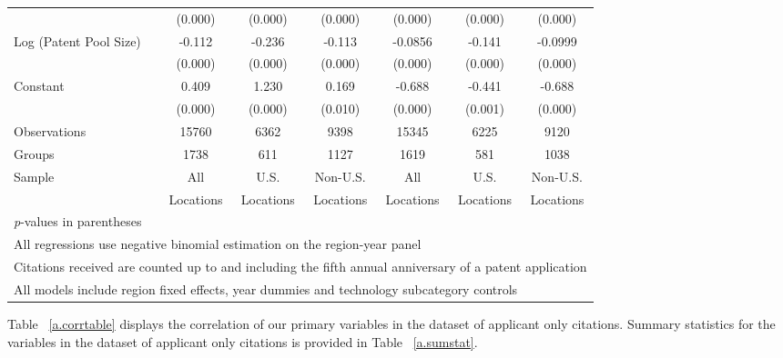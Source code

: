 \documentclass[12pt,letterpaper]{article}
\begin{document}
\begin{table}[htbp]
\begin{tabular}{l*{6}{c}}
                &  (0.000)&  (0.000)&  (0.000)&  (0.000)&  (0.000)&  (0.000)\\
Log (Patent Pool Size)&   -0.112&   -0.236&   -0.113&  -0.0856&   -0.141&  -0.0999\\
                &  (0.000)&  (0.000)&  (0.000)&  (0.000)&  (0.000)&  (0.000)\\
Constant        &    0.409&    1.230&    0.169&   -0.688&   -0.441&   -0.688\\
                &  (0.000)&  (0.000)&  (0.010)&  (0.000)&  (0.001)&  (0.000)\\
\hline
Observations    &    15760&     6362&     9398&    15345&     6225&     9120\\
Groups          &     1738&      611&     1127&     1619&      581&     1038\\
Sample&All &U.S. &Non-U.S.&All &U.S. &Non-U.S. \\
          &Locations &Locations&Locations&Locations &Locations&Locations \\
\hline\hline
\multicolumn{7}{l}{\footnotesize \textit{p}-values in parentheses}\\
\multicolumn{7}{l}{\footnotesize All regressions use negative binomial estimation on the region-year panel}\\
\multicolumn{7}{l}{\footnotesize Citations received are counted up to and including the fifth annual anniversary of a patent application}\\
\multicolumn{7}{l}{\footnotesize All models include region fixed effects, year dummies and technology subcategory controls}\\
\end{tabular}
\end{table}


Table ~\ref{a.corrtable} displays the correlation of our primary variables in the dataset of applicant only citations. Summary statistics for the variables in the dataset of applicant only citations is provided in Table ~\ref{a.sumstat}.
\end{document}
